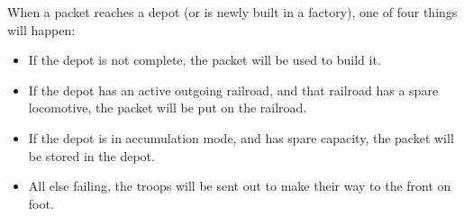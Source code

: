 \documentclass[12pt]{article}
\begin{document}
When a packet reaches a depot (or is newly built in a factory), one of
four things will happen:
\begin{itemize}
\item If the depot is not complete, the packet will be used to build
  it. 
\item If the depot has an active outgoing railroad, and that railroad
  has a spare locomotive, the packet will be put on the railroad. 
\item If the depot is in accumulation mode, and has spare capacity,
  the packet will be stored in the depot. 
\item All else failing, the troops will be sent out to make their way
  to the front on foot. 
\end{itemize}
\end{document}
